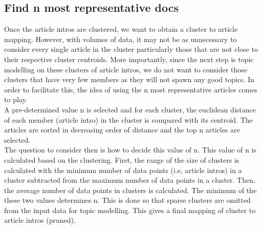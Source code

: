 

\subsection{Find n most representative docs}
\label{sec:Find_n_docs}
Once the article intros are clustered, we want to obtain a cluster to article mapping. However, with volumes of data, it may not be as unnecessary to consider every single article in the cluster particularly those that are not close to their respective cluster centroids. More importantly, since the next step is topic modelling on these clusters of article intros, we do not want to consider those clusters that have very few members as they will not spawn any good topics. In order to facilitate this, the idea of using the n most representative articles comes to play. \\

A pre-determined value n is selected and for each cluster, the euclidean distance of each member (article intro) in the cluster is compared with its centroid. The articles are sorted in decreasing order of distance and the top n articles are selected.\\

The question to consider then is how to decide this value of n. 
This value of n is calculated based on the clustering. First, the range of the size of clusters is calculated with the minimum number of data points (i.e, article intros) in a cluster subtracted from the maximum number of data points in a cluster. Then, the average number of data points in clusters is calculated. The minimum of the these two values determines n. This is done so that sparse clusters are omitted from the input data for topic modelling. This gives a final mapping of cluster to article intros (pruned).\\

